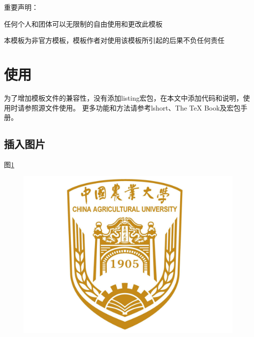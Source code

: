 \documentclass[twoside,maketable]{cauthesis}
\begin{document}
    重要声明：
    \begin{level}{1}
        \item 任何个人和团体可以无限制的自由使用和更改此模板
        \item 本模板为非官方模板，模板作者对使用该模板所引起的后果不负任何责任
    \end{level}

    \section{使用}
    为了增加模板文件的兼容性，没有添加listing宏包，在本文中添加代码和说明，使用时请参照源文件使用。
    更多功能和方法请参考lshort、The TeX Book及宏包手册。

    \subsection{插入图片}
    图\ref{fig:1}%
    \begin{figure}[H]
        \centering
        \includegraphics{./Picture/Logo.jpg}
        \label{fig:1}%
    \end{figure}
\end{document}
